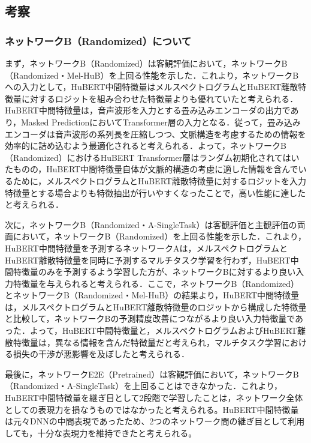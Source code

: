 \subsection{考察}
\subsubsection{ネットワークB（Randomized）について}
まず，ネットワークB（Randomized）は客観評価において，ネットワークB（Randomized・Mel-HuB）を上回る性能を示した．これより，ネットワークBへの入力として，HuBERT中間特徴量はメルスペクトログラムとHuBERT離散特徴量に対するロジットを組み合わせた特徴量よりも優れていたと考えられる．HuBERT中間特徴量は，音声波形を入力とする畳み込みエンコーダの出力であり，Masked PredictionにおいてTransformer層の入力となる．従って，畳み込みエンコーダは音声波形の系列長を圧縮しつつ、文脈構造を考慮するための情報を効率的に詰め込むよう最適化されると考えられる．よって，ネットワークB（Randomized）におけるHuBERT Transformer層はランダム初期化されてはいたものの，HuBERT中間特徴量自体が文脈的構造の考慮に適した情報を含んでいるために，メルスペクトログラムとHuBERT離散特徴量に対するロジットを入力特徴量とする場合よりも特徴抽出が行いやすくなったことで，高い性能に達したと考えられる．

次に，ネットワークB（Randomized・A-SingleTask）は客観評価と主観評価の両面において，ネットワークB（Randomized）を上回る性能を示した．これより，HuBERT中間特徴量を予測するネットワークAは，メルスペクトログラムとHuBERT離散特徴量を同時に予測するマルチタスク学習を行わず，HuBERT中間特徴量のみを予測するよう学習した方が、ネットワークBに対するより良い入力特徴量を与えられると考えられる．ここで，ネットワークB（Randomized）とネットワークB（Randomized・Mel-HuB）の結果より，HuBERT中間特徴量は，メルスペクトログラムとHuBERT離散特徴量のロジットから構成した特徴量と比較して，ネットワークBの予測精度改善につながるより良い入力特徴量であった．よって，HuBERT中間特徴量と，メルスペクトログラムおよびHuBERT離散特徴量は，異なる情報を含んだ特徴量だと考えられ，マルチタスク学習における損失の干渉が悪影響を及ぼしたと考えられる．

最後に，ネットワークE2E（Pretrained）は客観評価において，ネットワークB（Randomized・A-SingleTask）を上回ることはできなかった．これより，HuBERT中間特徴量を継ぎ目として2段階で学習したことは，ネットワーク全体としての表現力を損なうものではなかったと考えられる。HuBERT中間特徴量は元々DNNの中間表現であったため、2つのネットワーク間の継ぎ目として利用しても，十分な表現力を維持できたと考えられる。

